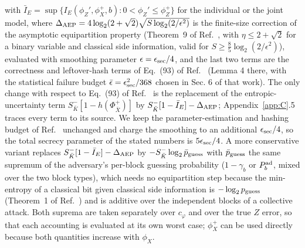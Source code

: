 \documentclass[aps,pra,twocolumn,superscriptaddress,nofootinbib]{revtex4-2}
\begin{document}
with $\bar I_E=\sup\{I_E(\phi_Z',\phi_X^+,b):0<\phi_Z'\le\phi_Z^+\}$ for the individual or the joint model, where $\Delta_{\rm AEP}=4\log_2(2+\sqrt2)\sqrt{S\log_2(2/\epsilon^2)}$ is the finite-size correction of the asymptotic equipartition property (Theorem~9 of Ref.~\cite{TCR09}, with $\eta\le 2+\sqrt2$ for a binary variable and classical side information, valid for $S\ge\tfrac85\log_2(2/\epsilon^2)$), evaluated with smoothing parameter $\epsilon=\epsilon_{\rm sec}/4$, and the last two terms are the correctness and leftover-hash terms of Eq.~(93) of Ref.~\cite{T25} (Lemma 4 there, with the statistical failure budget $\bar\epsilon=\epsilon_{\rm sec}^2/368$ chosen in Sec. 6 of that work). The only change with respect to Eq.~(93) of Ref.~\cite{T25} is the replacement of the entropic-uncertainty term $S^-_{\bar K}[1-h(\Phi^+_{\bar X})]$ by $S^-_{\bar K}[1-\bar I_E]-\Delta_{\rm AEP}$; Appendix~\ref{app:C}.5 traces every term to its source. We keep the parameter-estimation and hashing budget of Ref.~\cite{T25} unchanged and charge the smoothing to an additional $\epsilon_{\rm sec}/4$, so the total secrecy parameter of the stated numbers is $5\epsilon_{\rm sec}/4$. A more conservative variant replaces $S^-_{\bar K}[1-\bar I_E]-\Delta_{\rm AEP}$ by $-S^-_{\bar K}\log_2 \bar p_{\rm guess}$ with $\bar p_{\rm guess}$ the same supremum of the adversary's per-block guessing probability ($1-\gamma_b$ or $P^{\rm ad}_b$, mixed over the two block types), which needs no equipartition step because the min-entropy of a classical bit given classical side information is $-\log_2 p_{\rm guess}$ (Theorem~1 of Ref.~\cite{KRS09}) and is additive over the independent blocks of a collective attack. Both suprema are taken separately over $c_\varphi$ and over the true $Z$ error, so that each accounting is evaluated at its own worst case; $\phi_X^+$ can be used directly because both quantities increase with $\phi_X$.
\end{document}
